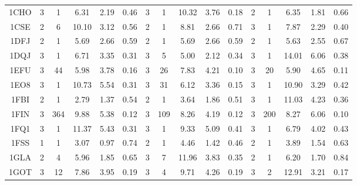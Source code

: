 \begin{longtable}{c c c c c c|c c c c c|c c c c c}
 {\tiny 1CHO}&{\tiny 3}&{\tiny 1}&{\tiny 6.31}&{\tiny 2.19}&{\tiny 0.46}&{\tiny 3}&{\tiny 1}&{\tiny 10.32}&{\tiny 3.76}&{\tiny 0.18}&{\tiny 2}&{\tiny 1}&{\tiny 6.35}&{\tiny 1.81}&{\tiny 0.66}\\ 
 {\tiny 1CSE}&{\tiny 2}&{\tiny 6}&{\tiny 10.10}&{\tiny 3.12}&{\tiny 0.56}&{\tiny 2}&{\tiny 1}&{\tiny 8.81}&{\tiny 2.66}&{\tiny 0.71}&{\tiny 3}&{\tiny 1}&{\tiny 7.87}&{\tiny 2.29}&{\tiny 0.40}\\ 
 {\tiny 1DFJ}&{\tiny 2}&{\tiny 1}&{\tiny 5.69}&{\tiny 2.66}&{\tiny 0.59}&{\tiny 2}&{\tiny 1}&{\tiny 5.69}&{\tiny 2.66}&{\tiny 0.59}&{\tiny 2}&{\tiny 1}&{\tiny 5.63}&{\tiny 2.55}&{\tiny 0.67}\\ 
 {\tiny 1DQJ}&{\tiny 3}&{\tiny 1}&{\tiny 6.71}&{\tiny 3.35}&{\tiny 0.31}&{\tiny 3}&{\tiny 5}&{\tiny 5.00}&{\tiny 2.12}&{\tiny 0.34}&{\tiny 3}&{\tiny 1}&{\tiny 14.01}&{\tiny 6.06}&{\tiny 0.38}\\ 
 {\tiny 1EFU}&{\tiny 3}&{\tiny 44}&{\tiny 5.98}&{\tiny 3.78}&{\tiny 0.16}&{\tiny 3}&{\tiny 26}&{\tiny 7.83}&{\tiny 4.21}&{\tiny 0.10}&{\tiny 3}&{\tiny 20}&{\tiny 5.90}&{\tiny 4.65}&{\tiny 0.11}\\ 
 {\tiny 1EO8}&{\tiny 3}&{\tiny 1}&{\tiny 10.73}&{\tiny 5.54}&{\tiny 0.31}&{\tiny 3}&{\tiny 31}&{\tiny 6.12}&{\tiny 3.36}&{\tiny 0.15}&{\tiny 3}&{\tiny 1}&{\tiny 10.90}&{\tiny 3.29}&{\tiny 0.42}\\ 
 {\tiny 1FBI}&{\tiny 2}&{\tiny 1}&{\tiny 2.79}&{\tiny 1.37}&{\tiny 0.54}&{\tiny 2}&{\tiny 1}&{\tiny 3.64}&{\tiny 1.86}&{\tiny 0.51}&{\tiny 3}&{\tiny 1}&{\tiny 11.03}&{\tiny 4.23}&{\tiny 0.36}\\ 
 {\tiny 1FIN}&{\tiny 3}&{\tiny 364}&{\tiny 9.88}&{\tiny 5.38}&{\tiny 0.12}&{\tiny 3}&{\tiny 109}&{\tiny 8.26}&{\tiny 4.19}&{\tiny 0.12}&{\tiny 3}&{\tiny 200}&{\tiny 8.27}&{\tiny 6.06}&{\tiny 0.10}\\ 
 {\tiny 1FQ1}&{\tiny 3}&{\tiny 1}&{\tiny 11.37}&{\tiny 5.43}&{\tiny 0.31}&{\tiny 3}&{\tiny 1}&{\tiny 9.33}&{\tiny 5.09}&{\tiny 0.41}&{\tiny 3}&{\tiny 1}&{\tiny 6.79}&{\tiny 4.02}&{\tiny 0.43}\\ 
 {\tiny 1FSS}&{\tiny 1}&{\tiny 1}&{\tiny 3.07}&{\tiny 0.97}&{\tiny 0.74}&{\tiny 2}&{\tiny 1}&{\tiny 4.46}&{\tiny 1.42}&{\tiny 0.46}&{\tiny 2}&{\tiny 1}&{\tiny 3.89}&{\tiny 1.54}&{\tiny 0.63}\\ 
 {\tiny 1GLA}&{\tiny 2}&{\tiny 4}&{\tiny 5.96}&{\tiny 1.85}&{\tiny 0.65}&{\tiny 3}&{\tiny 7}&{\tiny 11.96}&{\tiny 3.83}&{\tiny 0.35}&{\tiny 2}&{\tiny 1}&{\tiny 6.20}&{\tiny 1.70}&{\tiny 0.84}\\ 
 {\tiny 1GOT}&{\tiny 3}&{\tiny 12}&{\tiny 7.86}&{\tiny 3.95}&{\tiny 0.19}&{\tiny 3}&{\tiny 4}&{\tiny 9.71}&{\tiny 4.26}&{\tiny 0.19}&{\tiny 3}&{\tiny 2}&{\tiny 12.91}&{\tiny 3.21}&{\tiny 0.17}\\ 

\end{longtable}
